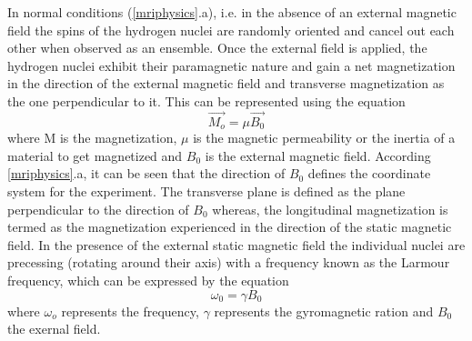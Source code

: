 \documentclass[msthesis.tex]{subfiles}
\begin{document}
In normal conditions (\autoref{mriphysics}.a), i.e. in the absence of an external magnetic field the spins of the hydrogen nuclei are randomly oriented and cancel out each other when observed as an ensemble. Once the external field is applied, the hydrogen nuclei exhibit their paramagnetic nature and gain a net magnetization in the direction of the external magnetic field and transverse magnetization as the one perpendicular to it. This can be represented using the equation
\begin{equation}
       \Vec{M_o} = \mu \Vec{B_0}
\end{equation}
where M is the magnetization, $\mu$ is the magnetic permeability or the inertia of a material to get magnetized and $B_0$ is the external magnetic field. According \autoref{mriphysics}.a, it can be seen that the direction of $B_0$ defines the coordinate system for the experiment. The transverse plane is defined as the plane perpendicular to the direction of $B_0$ whereas, the longitudinal magnetization is termed as the magnetization experienced in the direction of the static magnetic field. In the presence of the external static magnetic field the individual nuclei are precessing (rotating around their axis) with a frequency known as the Larmour frequency, which can be expressed by the equation
\begin{equation}
    \omega_0 = \gamma B_0
    \label{larmour}
\end{equation}
where $\omega_o$ represents the frequency, $\gamma$ represents the gyromagnetic ration and $B_0$ the exernal field.
\end{document}
